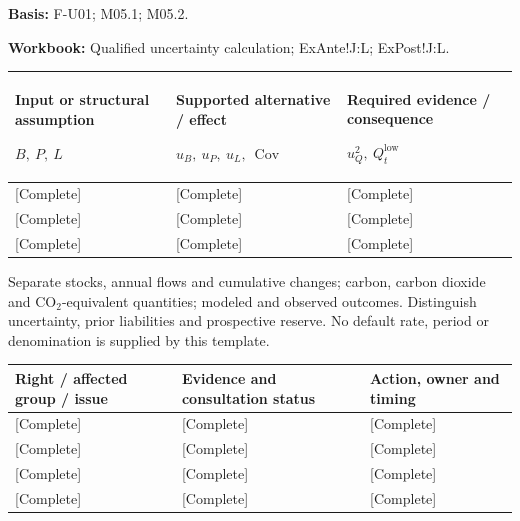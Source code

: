 \textbf{Basis:} F-U01; M05.1; M05.2.\par
\textbf{Workbook:} Qualified uncertainty calculation; ExAnte!J:L; ExPost!J:L.\par\endgroup
{\sffamily\fontsize{8.3}{10.3}\selectfont\begin{longtable}{@{}P{52.79mm} P{56.09mm} P{56.09mm}@{}}
\toprule
\textbf{Input or structural assumption}\par {\normalfont\fontsize{8.2}{10}\selectfont $B,\ P,\ L$} & \textbf{Supported alternative / effect}\par {\normalfont\fontsize{8.2}{10}\selectfont $u_B,\ u_P,\ u_L,\ \operatorname{Cov}$} & \textbf{Required evidence / consequence}\par {\normalfont\fontsize{8.2}{10}\selectfont $u_Q^2,\ Q_t^{\mathrm{low}}$}\\\midrule\endhead
\rule{0pt}{7.7mm}[Complete] & [Complete] & [Complete]\\\hline
\rule{0pt}{7.7mm}[Complete] & [Complete] & [Complete]\\\hline
\rule{0pt}{7.7mm}[Complete] & [Complete] & [Complete]\\\hline
\end{longtable}}
\begin{Notice}Separate stocks, annual flows and cumulative changes; carbon, carbon dioxide and CO$_2$-equivalent quantities; modeled and observed outcomes. Distinguish uncertainty, prior liabilities and prospective reserve. No default rate, period or denomination is supplied by this template.\end{Notice}
{\sffamily\fontsize{8.3}{10.3}\selectfont\begin{longtable}{@{}P{52.79mm} P{57.74mm} P{54.44mm}@{}}
\toprule
\textbf{Right / affected group / issue} & \textbf{Evidence and consultation status} & \textbf{Action, owner and timing}\\\midrule\endhead
\rule{0pt}{7.7mm}[Complete] & [Complete] & [Complete]\\\hline
\rule{0pt}{7.7mm}[Complete] & [Complete] & [Complete]\\\hline
\rule{0pt}{7.7mm}[Complete] & [Complete] & [Complete]\\\hline
\rule{0pt}{7.7mm}[Complete] & [Complete] & [Complete]\\\hline
\end{longtable}}
